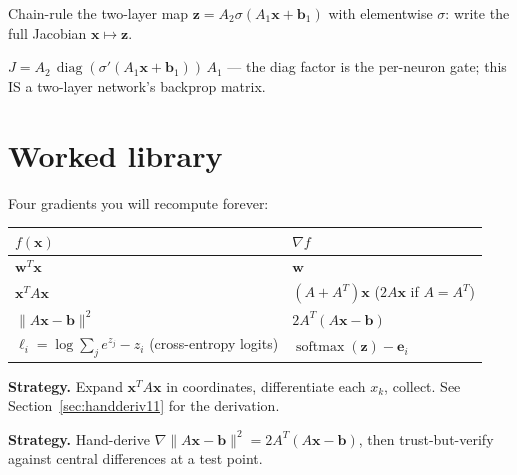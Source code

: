 \begin{exercise}[medium]
Chain-rule the two-layer map $\mathbf z=A_2\sigma(A_1\mathbf x+\mathbf
b_1)$ with elementwise $\sigma$: write the full Jacobian
$\mathbf x\mapsto\mathbf z$.
\begin{solution}
$J=A_2\,\operatorname{diag}(\sigma'(A_1\mathbf x+\mathbf b_1))\,A_1$ ---
the diag factor is the per-neuron gate; this IS a two-layer network's
backprop matrix.
\end{solution}
\end{exercise}

\section{Worked library}\label{sec:mvc-library}

Four gradients you will recompute forever:

\begin{center}
\begin{tabularx}{\textwidth}{l>{\raggedright\arraybackslash}X}
\toprule
$f(\mathbf x)$ & $\nabla f$\\
\midrule
$\mathbf w^{T}\mathbf x$ & $\mathbf w$\\
$\mathbf x^{T}A\mathbf x$ & $(A+A^{T})\mathbf x$ \quad($2A\mathbf x$ if
$A=A^{T}$)\\
$\lVert A\mathbf x-\mathbf b\rVert^{2}$ & $2A^{T}(A\mathbf x-\mathbf b)$\\
$\ell_i=\log\sum_j e^{z_j}-z_i$ (cross-entropy logits) &
$\operatorname{softmax}(\mathbf z)-\mathbf e_i$\\
\bottomrule
\end{tabularx}
\end{center}

\begin{example}\label{ex:quadgrad}
\textbf{Strategy.} Expand $\mathbf x^{T}A\mathbf x$ in coordinates,
differentiate each $x_k$, collect.
See Section~\ref{sec:handderiv11} for the derivation.
\end{example}

\begin{example}\label{ex:fdcheck}
\textbf{Strategy.} Hand-derive $\nabla\lVert A\mathbf x-\mathbf
b\rVert^{2}=2A^{T}(A\mathbf x-\mathbf b)$, then trust-but-verify against
central differences at a test point.
\end{example}

